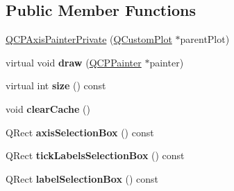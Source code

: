 \subsection*{Public Member Functions}
\begin{DoxyCompactItemize}
\item 
\hyperlink{classQCPAxisPainterPrivate_a0f14aa5c4aa83dbcd68984a7c73bf94f}{Q\+C\+P\+Axis\+Painter\+Private} (\hyperlink{classQCustomPlot}{Q\+Custom\+Plot} $\ast$parent\+Plot)
\item 
virtual void {\bfseries draw} (\hyperlink{classQCPPainter}{Q\+C\+P\+Painter} $\ast$painter)\hypertarget{classQCPAxisPainterPrivate_a0207a99bdf9c4f70af20928898ddc2fc}{}\label{classQCPAxisPainterPrivate_a0207a99bdf9c4f70af20928898ddc2fc}

\item 
virtual int {\bfseries size} () const \hypertarget{classQCPAxisPainterPrivate_a8b2dc0bd2ccbf6bd450733ec9e410a38}{}\label{classQCPAxisPainterPrivate_a8b2dc0bd2ccbf6bd450733ec9e410a38}

\item 
void {\bfseries clear\+Cache} ()\hypertarget{classQCPAxisPainterPrivate_a7b6806e32c44384fd0ae4dcdaa72b1b5}{}\label{classQCPAxisPainterPrivate_a7b6806e32c44384fd0ae4dcdaa72b1b5}

\item 
Q\+Rect {\bfseries axis\+Selection\+Box} () const \hypertarget{classQCPAxisPainterPrivate_aaf93529ac60215ea020cdff5635c3e80}{}\label{classQCPAxisPainterPrivate_aaf93529ac60215ea020cdff5635c3e80}

\item 
Q\+Rect {\bfseries tick\+Labels\+Selection\+Box} () const \hypertarget{classQCPAxisPainterPrivate_af02fc189ab8460c202eb4138c9aca516}{}\label{classQCPAxisPainterPrivate_af02fc189ab8460c202eb4138c9aca516}

\item 
Q\+Rect {\bfseries label\+Selection\+Box} () const \hypertarget{classQCPAxisPainterPrivate_ae907476bf8cf0ecd17620575e17c06b1}{}\label{classQCPAxisPainterPrivate_ae907476bf8cf0ecd17620575e17c06b1}

\end{DoxyCompactItemize}
